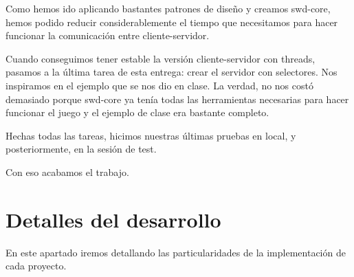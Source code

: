 Como hemos ido aplicando bastantes patrones de diseño y creamos swd-core, hemos podido reducir considerablemente el tiempo que necesitamos para hacer funcionar la comunicación entre cliente-servidor.

Cuando conseguimos tener estable la versión cliente-servidor con threads, pasamos a la última tarea de esta entrega: crear el servidor con selectores. Nos inspiramos en el ejemplo que se nos dio en clase. La verdad, no nos costó demasiado porque swd-core ya tenía todas las herramientas necesarias para hacer funcionar el juego y el ejemplo de clase era bastante completo.

Hechas todas las tareas, hicimos nuestras últimas pruebas en local, y posteriormente, en la sesión de test. 

Con eso acabamos el trabajo.

\newpage
\section{Detalles del desarrollo}
En este apartado iremos detallando las particularidades de la implementación de cada proyecto.

